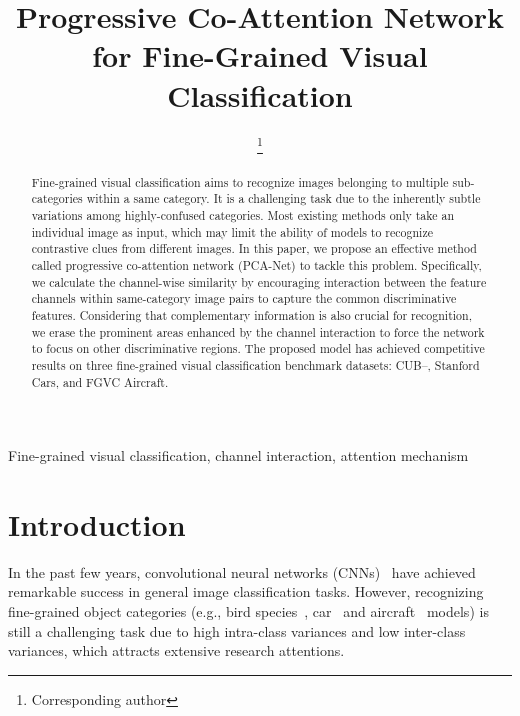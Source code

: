 \documentclass[conference]{IEEEtran}
\begin{document}
\title{Progressive Co-Attention Network for Fine-Grained Visual Classification}



\author{
\thanks{ Corresponding author}
}


\maketitle

\begin{abstract}
Fine-grained visual classification aims to recognize images belonging to multiple sub-categories within a same category. It is a challenging task due to the inherently subtle variations among highly-confused categories. Most existing methods only take an individual image as input, which may limit the ability of models to recognize contrastive clues from different images. In this paper, we propose an effective method called progressive co-attention network (PCA-Net) to tackle this problem. Specifically, we calculate the channel-wise similarity by encouraging interaction between the feature channels within same-category image pairs to capture the common discriminative features. Considering that complementary information is also crucial for recognition, we erase the prominent areas enhanced by the channel interaction to force the network to focus on other discriminative regions. The proposed model has achieved competitive results on three fine-grained visual classification benchmark datasets: CUB--, Stanford Cars, and FGVC Aircraft. 
\end{abstract}

\begin{IEEEkeywords}
Fine-grained visual classification, channel interaction, attention mechanism
\end{IEEEkeywords}

\section{Introduction}
In the past few years, convolutional neural networks (CNNs)~\cite{krizhevsky2012classification,Simonyan2014recognition,szegedy2015going,he2016deep} have achieved remarkable success in general image classification tasks. However, recognizing fine-grained object categories (e.g., bird species~\cite{wah2011caltech}, car~\cite{krause20133d} and aircraft~\cite{maji13fine} models) is still a challenging task due to high intra-class variances and low inter-class variances, which attracts extensive research attentions. 
\end{document}
